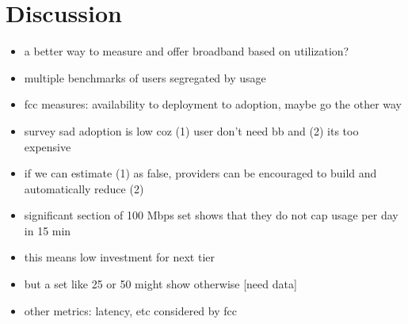 \section{Discussion}
\label{sec:discussion}

\begin{itemize}
\itemsep0em
\item a better way to measure and offer broadband based on utilization?
\item multiple benchmarks of users segregated by usage
\item fcc measures: availability to deployment to adoption, maybe go the other way
\item survey sad adoption is low coz (1) user don't need bb and (2) its too expensive
\item if we can estimate (1) as false, providers can be encouraged to build and automatically
reduce (2)
\item significant section of 100 Mbps set shows that they do not cap usage per day in 15 min
\item this means low investment for next tier
\item but a set like 25 or 50 might show otherwise [need data]
\item other metrics: latency, etc considered by fcc
\end{itemize}